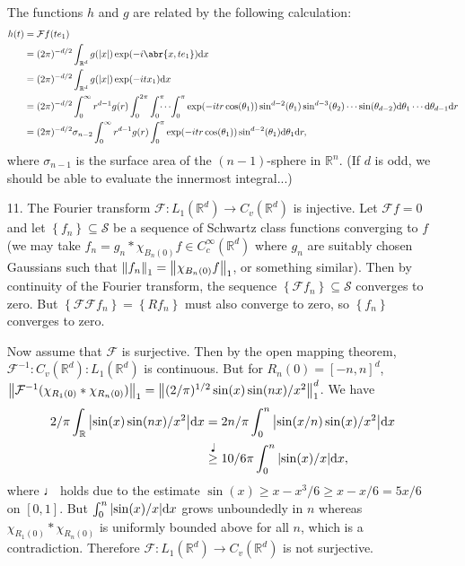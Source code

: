 \documentclass[11pt,leqno]{article}
\theoremstyle{plain}
\theoremstyle{definition}
\numberwithin{equation}{section}
\numberwithin{lem}{section}
\newcommand{\cbr}[1]{\left\{#1\right\}}
\newcommand{\eq}[1]{\overset{#1}{=}}
\newcommand{\gq}[1]{\overset{#1}{\geq}}
\begin{document}
\begin{enumerate}
    The functions $h$ and $g$ are related by the following calculation: \begin{align*}
      h(t) &= \mathcal Ff(te_1)\\
      &= (2\pi)^{-d/2}\int_{\mathbb R^d}g(\abs{x})\exp(-i\abr{x,te_1})\dd x\\
      &= (2\pi)^{-d/2}\int_{\mathbb R^d}g(\abs{x})\exp(-itx_1)\dd x \\
      &= (2\pi)^{-d/2}\int_0^\infty r^{d-1}g(r)\int_0^{2\pi}\int_0^\pi\!\!\!\!\cdots\!\int_0^\pi\exp(-itr\cos(\theta_1))\sin^{d-2}(\theta_1)\sin^{d-3}(\theta_2)\cdots\sin(\theta_{d-2})\dd\theta_1\cdots\dd\theta_{d-1}\dd r\\
      &= (2\pi)^{-d/2}\sigma_{n-2}\int_0^\infty r^{d-1}g(r)\int_0^\pi\exp(-itr\cos(\theta_1))\sin^{d-2}(\theta_1)\dd\theta_1\dd r,
    \end{align*}
    where $\sigma_{n-1}$ is the surface area of the $(n-1)$-sphere in $\mathbb R^n$. (If $d$ is odd, we should be able to evaluate the innermost integral...)
    \item[11.] The Fourier transform $\mathcal F\colon L_1(\mathbb R^d)\to C_v(\mathbb R^d)$ is injective. Let $\mathcal Ff = 0$ and let $\cbr{f_n}\subseteq \mathcal S$ be a sequence of Schwartz class functions converging to $f$ (we may take $f_n = g_n\ast \chi_{B_n(0)}f\in C_c^\infty(\mathbb R^d)$ where $g_n$ are suitably chosen Gaussians such that $\norm{f_n}_1 = \norm{\chi_{B_n(0)}f}_1$, or something similar). Then by continuity of the Fourier transform, the sequence $\cbr{\mathcal Ff_n}\subseteq \mathcal S$ converges to zero. But $\cbr{\mathcal F\mathcal Ff_n} = \cbr{Rf_n}$ must also converge to zero, so $\cbr{f_n}$ converges to zero. 
    
    Now assume that $\mathcal F$ is surjective. Then by the open mapping theorem, $\mathcal F^{-1}\colon C_v(\mathbb R^d)\colon L_1(\mathbb R^d)$ is continuous. But for $R_n(0) = [-n,n]^d$, $\norm{\mathcal F^{-1}(\chi_{R_1(0)}\ast \chi_{R_n(0)})}_1 = \norm{(2/\pi)^{1/2}\sin(x)\sin(nx)/x^2}_1^d$. We have \begin{align*}
      2/\pi\int_{\mathbb R}\abs{\sin(x)\sin(nx)/x^2}\dd x &= 2n/\pi\int_0^n\abs{\sin(x/n)\sin(x)/x^2}\dd x\\
      &\gq{\quarternote} 10/6\pi \int_0^n \abs{\sin(x)/x}\dd x,
    \end{align*}
    where $\quarternote$ holds due to the estimate $\sin(x)\geq x-x^3/6\geq x-x/6 = 5x/6$ on $[0,1]$. But $\int_0^n \abs{\sin(x)/x}\dd x$ grows unboundedly in $n$ whereas $\chi_{R_1(0)}\ast \chi_{R_n(0)}$ is uniformly bounded above for all $n$, which is a contradiction. Therefore $\mathcal F\colon L_1(\mathbb R^d)\to C_v(\mathbb R^d)$ is not surjective. 


\end{enumerate}
\end{document}
